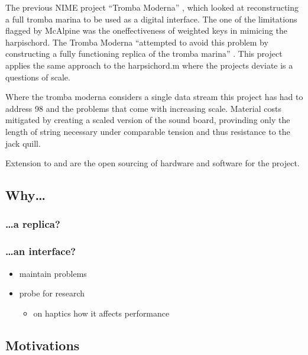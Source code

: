 The previous NIME project ``Tromba Moderna'' \cite{Baldwin2016}, which
looked at reconstructing a full tromba marina to be used as a digital
interface. The one of the limitations flagged by McAlpine was the
oneffectiveness of weighted keys in mimicing the harpischord. The Tromba
Moderna ``attempted to avoid this problem by constructing a fully
functioning replica of the tromba marina'' \cite{Baldwin}. This project
applies the same approach to the harpsichord.m where the projects
deviate is a questions of scale.

Where the tromba moderna considers a single data stream this project has
had to address 98 and the problems that come with increasing scale.
Material costs mitigated by creating a scaled version of the sound
board, provinding only the length of string necessary under comparable
tension and thus resistance to the jack quill.

Extension to \cite{McAlpine2014} and \cite{Baldwin2016} are the open
sourcing of hardware and software for the project.

\subsection{Why\ldots{}}\label{why}

\subsubsection{\ldots a replica?}\label{a-replica}

\subsubsection{\ldots an interface?}\label{an-interface}

\begin{itemize}
\tightlist
\item
  maintain problems
\item
  probe for research

  \begin{itemize}
  \tightlist
  \item
    on haptics how it affects performance
  \end{itemize}
\end{itemize}

\subsection{Motivations}\label{motivations}

